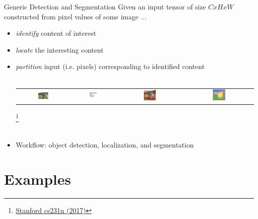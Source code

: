 \documentclass[handout]{beamer}
\begin{document}
\begin{frame}{Generic Detection and Segmentation}
Given an input tensor of size $CxHxW$ constructed from pixel values of some image ...
\begin{itemize}
  \item<1->\emph{identify} content of interest
  \item<2->\emph{locate} the interesting content 
  \item<3->\emph{partition} input (i.e. pixels) corresponding to identified content
 \\~\\ 
 \begin{tabular}{cccc}
\includegraphics[width=0.2\textwidth]{../media/cat1} &
\includegraphics[width=0.2\textwidth]{../media/cat2} &
\includegraphics[width=0.2\textwidth]{../media/cat3} & 
\includegraphics[width=0.2\textwidth]{../media/cat4}
\end{tabular}\footnote{\href{http://cs231n.stanford.edu/slides/2017/cs231n_2017_lecture11.pdf}{\color{blue}Stanford cs231n (2017)}}
\\~\\
\item<4->Workflow: object detection, localization, and segmentation 
\end{itemize}
\end{frame}

\section{Examples} 
\end{document}
